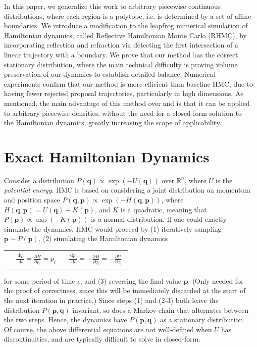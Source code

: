\documentclass{article} %
\newcommand{\bvec}[1]{\textbf{#1}}
\newcommand{\dd}{\;\mathrm{d}} %
\begin{document}
In this paper, we generalize this work to arbitrary piecewise continuous distributions, where each region is a polytope, i.e. is determined by a set of affine boundaries.  We introduce a modification to the leapfrog numerical simulation of Hamiltonian dynamics, called Reflective Hamiltonian Monte Carlo (RHMC), by incorporating reflection and refraction via detecting the first intersection of a linear trajectory with a boundary. We prove that our method has the correct stationary distribution, where the main technical difficulty is proving volume preservation of our dynamics to establish detailed balance.  Numerical experiments confirm that our method is more efficient than baseline HMC, due to having fewer rejected proposal trajectories, particularly in high dimensions.  As mentioned, the main advantage of this method over \cite{pakman2014exact} and \cite{pakman2013auxiliary} is that it can be applied to arbitrary piecewise densities, without the need for a closed-form solution to the Hamiltonian dynamics, greatly increasing the scope of applicability.


\section{Exact Hamiltonian Dynamics }

Consider a distribution $P(\bvec{q})\propto \exp(-U(\bvec{q}))$ over $\mathbb{R}^n$, where $U$ is the \emph{potential energy}.  HMC \cite{neal2011mcmc} is based on considering a joint distribution on momentum and position space $P(\bvec{q}, \bvec{p})\propto\exp(-H(\bvec{q}, \bvec{p}))$, where $H(\bvec{q}, \bvec{p})=U(\bvec{q})+K(\bvec{p})$, and $K$ is a quadratic, meaning that $P(\bvec{p}) \propto \exp(-K(\bvec{p}))$ is a normal distribution.  If one could exactly simulate the dynamics, HMC would proceed by (1) iteratively sampling $\bvec{p} \sim P(\bvec{p})$, 
(2) simulating the Hamiltonian dynamics
%
\begin{tabular}{p{5.5cm}p{7.8cm}}
{
\begin{align}\label{e:motion1}
&
\frac{\dd q_i}{\dd t} = \frac{\partial H}{\partial p_{i}} = p_i
\end{align} }
&{
\begin{align}\label{e:motion2}
\frac{\dd p_i}{\dd t} = 
-\frac{\partial H}{\partial q_{i}} = 
-\frac{\partial U}{\partial q_{i}}
\end{align} 
}
\end{tabular}
%
for some period of time $\epsilon$, and (3) reversing the final value $\bvec{p}$.  (Only needed for the proof of correctness, since this will be immediately discarded at the start of the next iteration in practice.)  Since steps (1) and (2-3) both leave the distribution $P(\bvec{p}, \bvec{q})$ invariant, so does a Markov chain that alternates between the two steps.  Hence, the dynamics have $P(\bvec{p}, \bvec{q})$ as a stationary distribution.  Of course, the above differential equations are not well-defined when $U$ has discontinuities, and are typically difficult to solve in closed-form.
\end{document}
